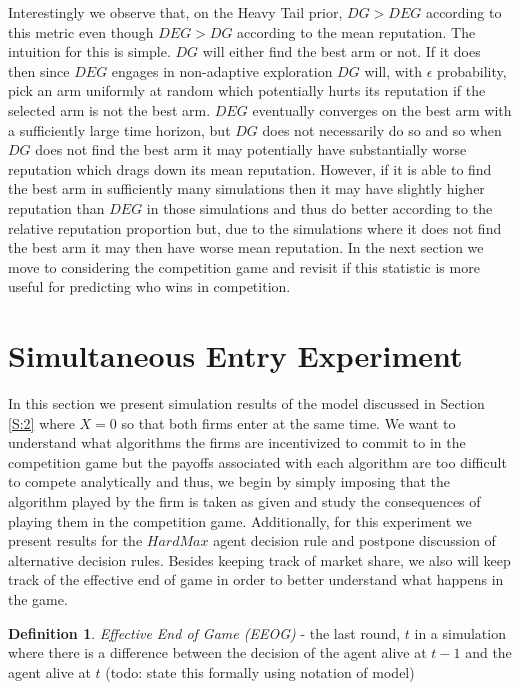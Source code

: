 \documentclass{article}
\theoremstyle{definition}
\newtheorem{definition}{Definition}[section]
\begin{document}
Interestingly we observe that, on the Heavy Tail prior, $DG > DEG$ according to this metric even though $DEG > DG$ according to the mean reputation. The intuition for this is simple. $DG$ will either find the best arm or not. If it does then since $DEG$ engages in non-adaptive exploration $DG$ will, with $\epsilon$ probability, pick an arm uniformly at random which potentially hurts its reputation if the selected arm is not the best arm. $DEG$ eventually converges on the best arm with a sufficiently large time horizon, but $DG$ does not necessarily do so and so when $DG$ does not find the best arm it may potentially have substantially worse reputation which drags down its mean reputation. However, if it is able to find the best arm in sufficiently many simulations then it may have slightly higher reputation than $DEG$ in those simulations and thus do better according to the relative reputation proportion but, due to the simulations where it does not find the best arm it may then have worse mean reputation. In the next section we move to considering the competition game and revisit if this statistic is more useful for predicting who wins in competition.

\section{Simultaneous Entry Experiment}
\label{S:6}

In this section we present simulation results of the model discussed in Section \ref{S:2} where $X = 0$ so that both firms enter at the same time. We want to understand what algorithms the firms are incentivized to commit to in the competition game but the payoffs associated with each algorithm are too difficult to compete analytically and thus, we begin by simply imposing that the algorithm played by the firm is taken as given and study the consequences of playing them in the competition game. Additionally, for this experiment we present results for the $HardMax$ agent decision rule and postpone discussion of alternative decision rules. Besides keeping track of market share, we also will keep track of the effective end of game in order to better understand what happens in the game.

\begin{definition}
\textit{Effective End of Game (EEOG)} - the last round, $t$ in a simulation where there is a difference between the decision of the agent alive at $t-1$ and the agent alive at $t$ (todo: state this formally using notation of model)
\end{definition}
\end{document}
